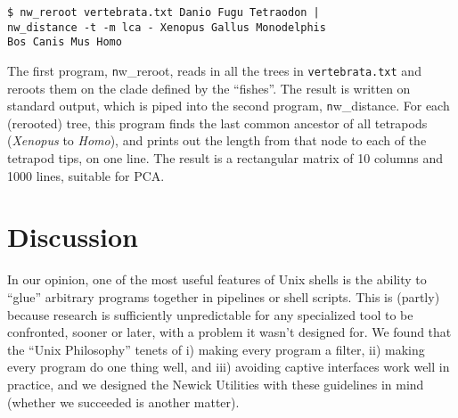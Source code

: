 \documentclass[a4paper,11pt]{article}
\newcommand{\prog}[1][]{{\texttt nw\_#1}}
\begin{document}
\begin{verbatim}
$ nw_reroot vertebrata.txt Danio Fugu Tetraodon | 
nw_distance -t -m lca - Xenopus Gallus Monodelphis
Bos Canis Mus Homo 
\end{verbatim}

The first program, \prog{reroot}, reads in all the trees in \texttt{vertebrata.txt} and reroots them on the clade defined by the ``fishes''. The result is written on standard output, which is piped into the second program, \prog{distance}. For each (rerooted) tree, this program finds the last common ancestor of all tetrapods (\textit{Xenopus} to \textit{Homo}), and prints out the length from that node to each of the tetrapod tips, on one line. The result is a rectangular matrix of 10 columns and 1000 lines, suitable for \textsc{PCA}.

\section*{Discussion}

In our opinion, one of the most useful features of Unix shells is the ability to  ``glue'' arbitrary programs together in pipelines or shell scripts. This is (partly) because research is sufficiently unpredictable for any specialized tool to be confronted, sooner or later, with a problem it wasn't designed for. We found that the ``Unix Philosophy'' tenets of i) making every program a filter, ii) making every program do one thing well, and iii) avoiding captive interfaces work well in practice, and we designed the Newick Utilities with these guidelines in mind (whether we succeeded is another matter).

 

\end{document}
